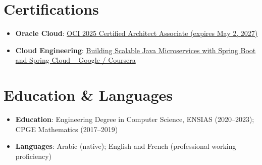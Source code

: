 \documentclass[a4paper,10pt]{article}
\newcommand{\resumeSkill}[2]{
  \item\small{\textbf{#1}{: #2 \vspace{-2pt}}}
}
\newcommand{\resumeCertification}[2]{
  \item\small{\textbf{#1}{: #2 \vspace{-2pt}}}
}
\newcommand{\resumeSkillListStart}{\begin{itemize}[leftmargin=0.15in, label={}]}
\newcommand{\resumeSkillListEnd}{\end{itemize}}
\begin{document}
\section{Certifications}
\resumeSkillListStart
  \resumeCertification{Oracle Cloud}{\href{https://catalog-education.oracle.com/ords/certview/sharebadge?id=5DCB8BDEE987AB0D33F444C6F0144AEC8E9596EF9BA9A3528575CBDC6F3F67AE}{OCI 2025 Certified Architect Associate (expires May 2, 2027)}}
  \resumeCertification{Cloud Engineering}{\href{https://www.coursera.org/account/accomplishments/certificate/SD425CFMRN48}{Building Scalable Java Microservices with Spring Boot and Spring Cloud -- Google / Coursera}}
\resumeSkillListEnd

\section{Education \& Languages}
\resumeSkillListStart
  \resumeSkill{Education}{Engineering Degree in Computer Science, ENSIAS (2020--2023); CPGE Mathematics (2017--2019)}
  \resumeSkill{Languages}{Arabic (native); English and French (professional working proficiency)}
\resumeSkillListEnd

\end{document}
